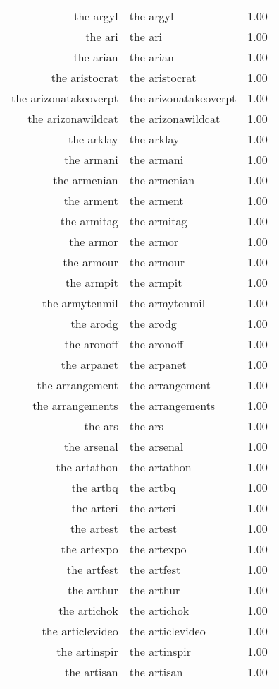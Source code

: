 \begin{table}[ht]
\begin{tabular}{rlr}
  the argyl & the argyl & 1.00 \\ 
  the ari & the ari & 1.00 \\ 
  the arian & the arian & 1.00 \\ 
  the aristocrat & the aristocrat & 1.00 \\ 
  the arizonatakeoverpt & the arizonatakeoverpt & 1.00 \\ 
  the arizonawildcat & the arizonawildcat & 1.00 \\ 
  the arklay & the arklay & 1.00 \\ 
  the armani & the armani & 1.00 \\ 
  the armenian & the armenian & 1.00 \\ 
  the arment & the arment & 1.00 \\ 
  the armitag & the armitag & 1.00 \\ 
  the armor & the armor & 1.00 \\ 
  the armour & the armour & 1.00 \\ 
  the armpit & the armpit & 1.00 \\ 
  the armytenmil & the armytenmil & 1.00 \\ 
  the arodg & the arodg & 1.00 \\ 
  the aronoff & the aronoff & 1.00 \\ 
  the arpanet & the arpanet & 1.00 \\ 
  the arrangement & the arrangement & 1.00 \\ 
  the arrangements & the arrangements & 1.00 \\ 
  the ars & the ars & 1.00 \\ 
  the arsenal & the arsenal & 1.00 \\ 
  the artathon & the artathon & 1.00 \\ 
  the artbq & the artbq & 1.00 \\ 
  the arteri & the arteri & 1.00 \\ 
  the artest & the artest & 1.00 \\ 
  the artexpo & the artexpo & 1.00 \\ 
  the artfest & the artfest & 1.00 \\ 
  the arthur & the arthur & 1.00 \\ 
  the artichok & the artichok & 1.00 \\ 
  the articlevideo & the articlevideo & 1.00 \\ 
  the artinspir & the artinspir & 1.00 \\ 
  the artisan & the artisan & 1.00 \\ 

\end{tabular}
\end{table}

